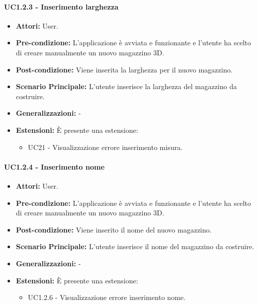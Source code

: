\paragraph{UC1.2.3 - Inserimento larghezza}
\begin{itemize}
    \item \textbf{Attori:} User.
    \item \textbf{Pre-condizione:}  L'applicazione è avviata e funzionante e l'utente ha scelto di creare manualmente un nuovo magazzino 3D.
    \item \textbf{Post-condizione:} Viene inserita la larghezza per il nuovo magazzino.
    \item \textbf{Scenario Principale:}  L’utente inserisce la larghezza del magazzino da costruire.
    \item \textbf{Generalizzazioni:} -
    \item \textbf{Estensioni:} È presente una estensione:
    \begin{itemize}
        \item UC21 - Visualizzazione errore inserimento misura.
    \end{itemize}
\end{itemize}


\paragraph{UC1.2.4 - Inserimento nome}
\begin{itemize}
    \item \textbf{Attori:} User.
    \item \textbf{Pre-condizione:}  L'applicazione è avviata e funzionante e l'utente ha scelto di creare manualmente un nuovo magazzino 3D.
    \item \textbf{Post-condizione:} Viene inserito il nome del nuovo magazzino.
    \item \textbf{Scenario Principale:}  L’utente inserisce il nome del magazzino da costruire.
    \item \textbf{Generalizzazioni:} -
    \item \textbf{Estensioni:} È presente una estensione:
    \begin{itemize}
        \item UC1.2.6 - Visualizzazione errore inserimento nome.
    \end{itemize}
\end{itemize}


